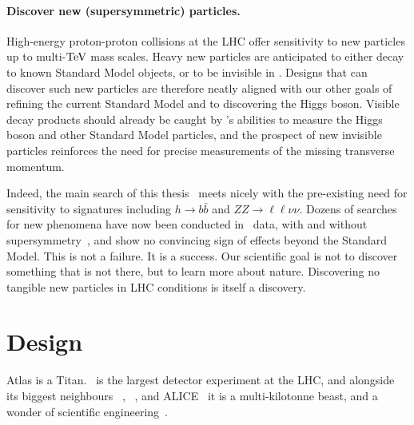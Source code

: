 \paragraph{Discover new (supersymmetric) particles.}
High-energy proton-proton collisions at the LHC offer sensitivity
to new particles up to multi-$\eV[T]$ mass scales.
Heavy new particles are anticipated to either decay to known Standard Model
objects, or to be invisible in \atlas.
Designs that can discover such new particles are therefore neatly aligned with
our other goals of refining the current Standard Model
and to discovering the Higgs boson.
Visible decay products should already be caught by \atlas's abilities
to measure the Higgs boson and other Standard Model particles,
and the prospect of new invisible particles reinforces the need for precise
measurements of the missing transverse momentum.

Indeed, the main search of this thesis~\cite{atlas2022searches}
meets nicely with the pre-existing need for sensitivity to signatures
including
$h \to b\bar b$
and
$ZZ \to \ell\ell\nu\nu$.
Dozens of searches for new phenomena have now been conducted in \atlas\ data,
with and without supersymmetry~\cite{
ATL-PHYS-PUB-2022-013,
ATL-PHYS-PUB-2022-007,
ATL-PHYS-PUB-2022-012,
ATL-PHYS-PUB-2022-036,
ATL-PHYS-PUB-2022-034
},
and show no convincing sign of effects beyond the Standard Model.
This is not a failure. It is a success.
Our scientific goal is not to discover something that is not there,
but to learn more about nature.
Discovering no tangible new particles in LHC conditions is itself a discovery.


\section{Design}
Atlas is a Titan.
\atlas\ is the largest detector experiment at the LHC,
and alongside its biggest neighbours
\cms~\cite{cms2008experiment},
\lhcb~\cite{lhcb2008experiment},
and ALICE~\cite{alice2008experiment}
it is a multi-kilotonne beast,
and a wonder of scientific engineering~\cite{
atlas1994proposal,
atlas2008experiment,
atlas1999design1,
atlas1999design2
}.

